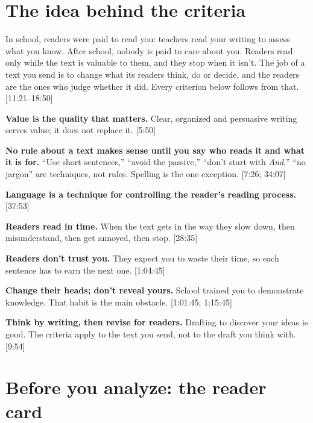 \documentclass[11pt]{article}
\newcommand{\ts}[1]{{\sffamily\footnotesize\color{muted}[#1]}}        %
\begin{document}
\section{The idea behind the criteria}

In school, readers were paid to read you: teachers read your writing to assess what you know. After school,
nobody is paid to care about you. Readers read only while the text is valuable to them, and they stop when it
isn't. The job of a text you send is to change what its readers think, do or decide, and the readers are the ones
who judge whether it did. Every criterion below follows from that. \ts{11:21--18:50}

\begin{principles}
  \item[P1] \textbf{Value is the quality that matters.} Clear, organized and persuasive writing serves value; it
        does not replace it. \ts{5:50}
  \item[P2] \textbf{No rule about a text makes sense until you say who reads it and what it is for.}
        ``Use short sentences,'' ``avoid the passive,'' ``don't start with \emph{And},'' ``no jargon'' are
        techniques, not rules. Spelling is the one exception. \ts{7:26; 34:07}
  \item[P3] \textbf{Language is a technique for controlling the reader's reading process.} \ts{37:53}
  \item[P4] \textbf{Readers read in time.} When the text gets in the way they slow down, then misunderstand, then
        get annoyed, then stop. \ts{28:35}
  \item[P5] \textbf{Readers don't trust you.} They expect you to waste their time, so each sentence has to earn
        the next one. \ts{1:04:45}
  \item[P6] \textbf{Change their heads; don't reveal yours.} School trained you to demonstrate knowledge. That
        habit is the main obstacle. \ts{1:01:45; 1:15:45}
  \item[P7] \textbf{Think by writing, then revise for readers.} Drafting to discover your ideas is good. The
        criteria apply to the text you send, not to the draft you think with. \ts{9:54}
\end{principles}

\section{Before you analyze: the reader card}
\end{document}
